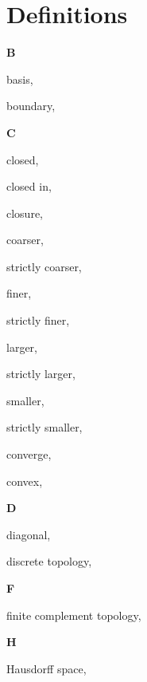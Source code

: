\section*{Definitions}

\begin{multicols}{2}

\vspace{1em}\large{\textbf{B}}

basis, \pageref{def:Basis}

boundary, \pageref{def:Boundary}

\vspace{1em}\large{\textbf{C}}

closed, \pageref{def:Closed}

\hspace{2em}closed in, \pageref{def:ClosedIn}

closure, \pageref{def:Closure}

coarser, \pageref{def:Comparable}

\hspace{2em}strictly coarser, \pageref{def:Comparable}

finer, \pageref{def:Comparable}

\hspace{2em}strictly finer, \pageref{def:Comparable}

larger, \pageref{def:Comparable}

\hspace{2em}strictly larger, \pageref{def:Comparable}

smaller, \pageref{def:Comparable}

\hspace{2em}strictly smaller, \pageref{def:Comparable}

converge, \pageref{def:Converge}

convex, \pageref{def:Convex}

\vspace{1em}\large{\textbf{D}}

diagonal, \pageref{def:Diagonal}

discrete topology, \pageref{def:DiscreteTopology}

\vspace{1em}\large{\textbf{F}}

finite complement topology, \pageref{def:FiniteComplementTopology}

\vspace{1em}\large{\textbf{H}}

Hausdorff space, \pageref{def:HausdorffSpace}


\end{multicols}
